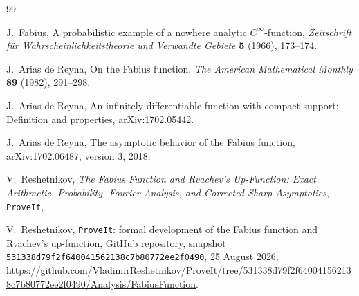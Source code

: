 \documentclass[11pt,oneside]{article}
\theoremstyle{definition}
\theoremstyle{remark}
\begin{document}
\nocite{fabius1966,arias1982,arias05442,arias2018,mainarticle,repo}
\begin{thebibliography}{99}

J.~Fabius,
\newblock A probabilistic example of a nowhere analytic $C^\infty$-function,
\newblock \emph{Zeitschrift f\"ur Wahrscheinlichkeitstheorie und Verwandte Gebiete}
\textbf{5} (1966), 173--174.

J.~Arias de Reyna,
\newblock On the Fabius function,
\newblock \emph{The American Mathematical Monthly} \textbf{89} (1982), 291--298.

J.~Arias de Reyna,
\newblock An infinitely differentiable function with compact support: Definition and properties,
\newblock arXiv:1702.05442.

J.~Arias de Reyna,
\newblock The asymptotic behavior of the Fabius function,
\newblock arXiv:1702.06487, version 3, 2018.

V.~Reshetnikov,
\newblock \emph{The Fabius Function and Rvachev's Up-Function: Exact Arithmetic,
Probability, Fourier Analysis, and Corrected Sharp Asymptotics},
\newblock \texttt{ProveIt},
.

V.~Reshetnikov,
\newblock \texttt{ProveIt}: formal development of the Fabius function and Rvachev's
up-function,
\newblock GitHub repository, snapshot
\texttt{531338d79f2f640041562138c7b80772ee2f0490}, 25 August 2026,
\newblock \url{https://github.com/VladimirReshetnikov/ProveIt/tree/531338d79f2f640041562138c7b80772ee2f0490/Analysis/FabiusFunction}.

\end{thebibliography}
\end{document}
